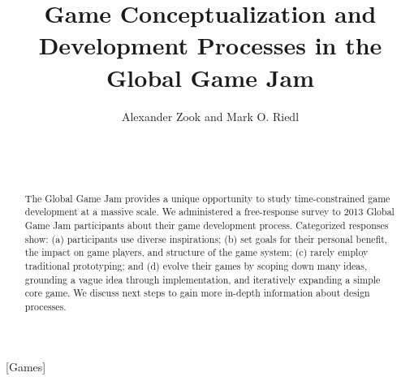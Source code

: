 \documentclass{sig-alternate}
\begin{document}

\title{Game Conceptualization and Development Processes in the Global Game Jam}

\author{}
\author{
\alignauthor
Alexander Zook and Mark O. Riedl\\
       \\
       \\
       \\
}

\maketitle
\begin{abstract}
The Global Game Jam provides a unique opportunity to study time-constrained game development at a massive scale.
We administered a free-response survey to 2013 Global Game Jam participants about their game development process.
Categorized responses show: 
(a) participants use diverse inspirations; 
(b) set goals for their personal benefit, the impact on game players, and structure of the game system; 
(c) rarely employ traditional prototyping; and 
(d) evolve their games by scoping down many ideas, grounding a vague idea through implementation, and iteratively expanding a simple core game.
We discuss next steps to gain more in-depth information about design processes.
\end{abstract}

[Games]
\end{document}
